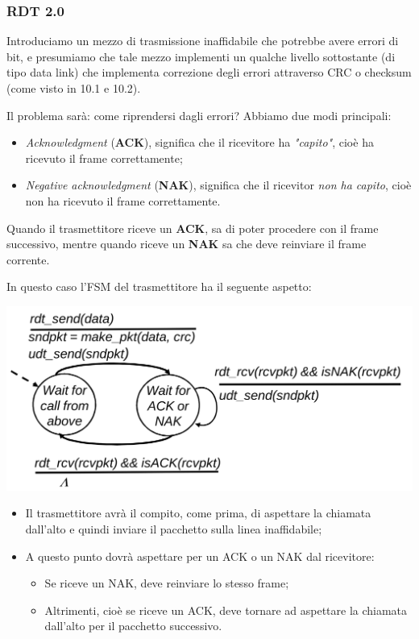 \documentclass[a4paper,11pt]{article}
\begin{document}
\subsubsection{RDT 2.0}
Introduciamo un mezzo di trasmissione inaffidabile che potrebbe avere errori di bit, e presumiamo che tale mezzo implementi un qualche livello sottostante (di tipo data link) che implementa correzione degli errori attraverso CRC o checksum (come visto in 10.1 e 10.2).

Il problema sarà: come riprendersi dagli errori? Abbiamo due modi principali:
\begin{itemize}
	\item \textit{Acknowledgment} (\textbf{ACK}), significa che il ricevitore ha \textit{"capito"}, cioè ha ricevuto il frame correttamente;
	\item \textit{Negative acknowledgment} (\textbf{NAK}), significa che il ricevitor \textit{non ha capito}, cioè non ha ricevuto il frame correttamente.
\end{itemize}

Quando il trasmettitore riceve un \textbf{ACK}, sa di poter procedere con il frame successivo, mentre quando riceve un \textbf{NAK} sa che deve reinviare il frame corrente.

In questo caso l'FSM del trasmettitore ha il seguente aspetto:
\begin{center}
	\includegraphics[scale=0.18]{../figures/rdt2fsm.png}
\end{center}
\begin{itemize}
	\item Il trasmettitore avrà il compito, come prima, di aspettare la chiamata dall'alto e quindi inviare il pacchetto sulla linea inaffidabile;
	\item A questo punto dovrà aspettare per un ACK o un NAK dal ricevitore:
		\begin{itemize}
			\item Se riceve un NAK, deve reinviare lo stesso frame;
			\item Altrimenti, cioè se riceve un ACK, deve tornare ad aspettare la chiamata dall'alto per il pacchetto successivo. 
		\end{itemize}
\end{itemize}
\end{document}
